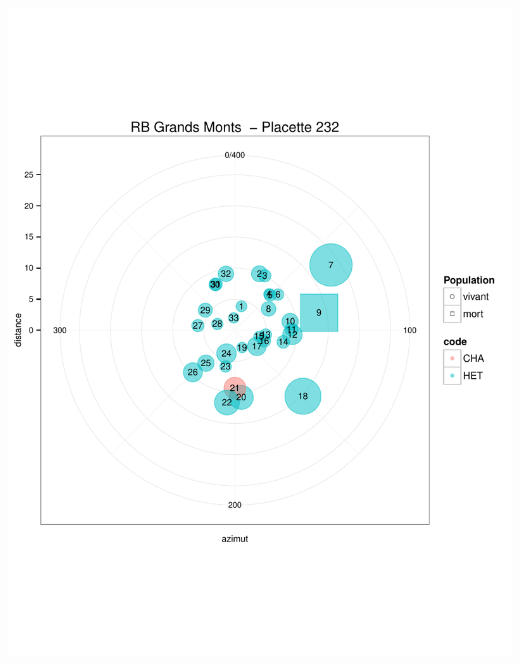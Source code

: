 \documentclass[a4paper]{book}\usepackage[]{graphicx}\usepackage[]{color}
\makeatletter
\def\maxwidth{ %
  \ifdim\Gin@nat@width>\linewidth
    \linewidth
  \else
    \Gin@nat@width
  \fi
}
\newenvironment{knitrout}{}{} %
\makeatother
\begin{document}
\begin{knitrout}
{\centering \includegraphics[width=\maxwidth]{Figures/PlanArbres-24} 

}





\end{knitrout}
\end{document}
